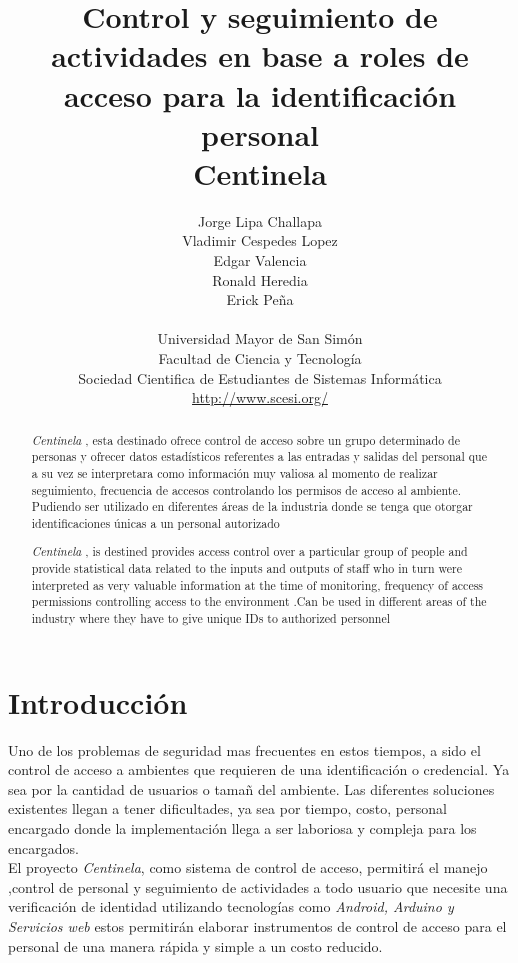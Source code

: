 \documentclass[11pt,twocolumn]{article}
\title{
\vspace{-3cm}   
Control y seguimiento de actividades en base a roles de acceso para la identificaci\'on personal \\ 
Centinela
}
\author{ 
Jorge Lipa Challapa\\
Vladimir Cespedes Lopez\\
Edgar Valencia \\
Ronald Heredia\\
Erick Pe\~na  \\
\\
Universidad Mayor de San Sim\'on \\
Facultad de Ciencia y Tecnolog\'ia \\
Sociedad Cientifica de Estudiantes de Sistemas Inform\'atica\\
\url {http://www.scesi.org/}
}
\date{}
\begin{document}
\maketitle

\begin{abstract} 
\textit{Centinela} , esta destinado ofrece control de acceso sobre un grupo determinado de personas y ofrecer datos estadísticos referentes a las entradas y salidas del personal que a su vez se interpretara como informaci\'on muy valiosa al momento de realizar seguimiento, frecuencia de accesos controlando los permisos de acceso al ambiente.  Pudiendo ser utilizado en diferentes \'areas de la industria donde se tenga que otorgar identificaciones \'unicas a un personal autorizado\\
\end{abstract}

\begin{abstract} 
\textit{Centinela} , is destined provides access control over a particular group of people and provide statistical data related to the inputs and outputs of staff who in turn were interpreted as very valuable information at the time of monitoring, frequency of access permissions controlling access to the environment .Can be used in different areas of the industry where they have to give unique IDs to authorized personnel
\end{abstract}


\section{Introducci\'on}
Uno de los problemas de seguridad mas frecuentes en estos tiempos, a sido el control de acceso a ambientes que requieren de una identificaci\'on o credencial. Ya sea por la cantidad de usuarios o tama\~n del ambiente. Las diferentes soluciones existentes llegan a tener dificultades, ya sea por tiempo, costo, personal encargado donde la implementaci\'on llega a ser laboriosa y compleja para los encargados. \\

El proyecto \textit{Centinela}, como sistema de control de acceso, permitir\'a el manejo ,control de personal y seguimiento de actividades a todo usuario que necesite una verificaci\'on de identidad utilizando tecnolog\'ias como \textit{Android, Arduino y Servicios web} estos permitir\'an elaborar instrumentos de control de acceso para el personal de una manera r\'apida y simple a un costo reducido. \\
\end{document}
